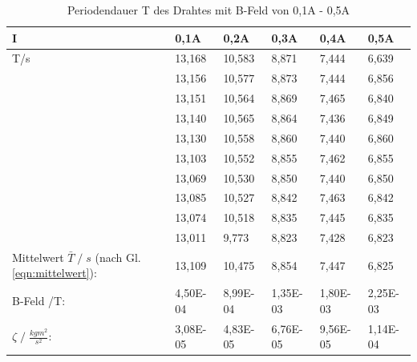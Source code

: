 \newpage
\begin{table}
    \caption{Periodendauer T des Drahtes mit B-Feld von 0,1A - 0,5A}
    \centering
    \begin{tabular}{p{3cm} | p{1.5cm} p{1.5cm} p{1.5cm} p{1.5cm} p{1.5cm}}
    I & 0,1A & 0,2A & 0,3A & 0,4A & 0,5A\\
    \midrule
    T\;/\;s & 13,168 & 10,583 & 8,871 &  7,444 &  6,639\\   
    & 13,156 & 10,577 & 8,873 &  7,444 &  6,856\\   
    & 13,151 & 10,564 & 8,869 &  7,465 &  6,840\\   
    & 13,140 & 10,565 & 8,864 &  7,436 &  6,849\\   
    & 13,130 & 10,558 & 8,860 &  7,440 &  6,860\\   
    & 13,103 & 10,552 & 8,855 &  7,462 &  6,855\\   
    & 13,069 & 10,530 & 8,850 &  7,440 &  6,850\\   
    & 13,085 & 10,527 & 8,842 &  7,463 &  6,842\\   
    & 13,074 & 10,518 & 8,835 &  7,445 &  6,835\\   
    & 13,011 &  9,773 & 8,823 &  7,428 &  6,823\\ 
    \midrule
    Mittelwert $\bar{T}\;/\;s$ (nach Gl. \ref{eqn:mittelwert}):    & 13,109 & 10,475 & 8,854 & 7,447 & 6,825 \\
    \midrule
    B-Feld \;/\;T: & 4,50E-04 & 8,99E-04 & 1,35E-03 & 1,80E-03 & 2,25E-03\\
    $\zeta\;/\;\frac{kgm^2}{s^2}$: & 3,08E-05 & 4,83E-05 & 6,76E-05 & 9,56E-05 & 1,14E-04\\
    \bottomrule
    \end{tabular}
    \label{tab:tabelle_01A}
\end{table}



